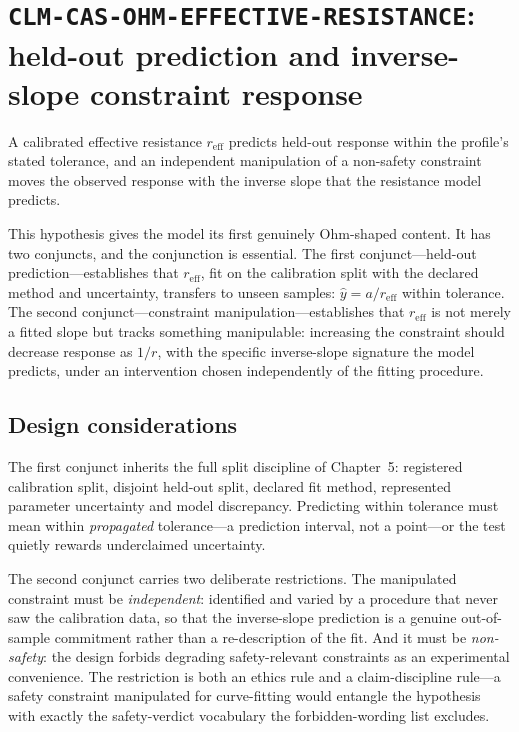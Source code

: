 \section{\texttt{CLM-CAS-OHM-EFFECTIVE-RESISTANCE}: held-out prediction and inverse-slope constraint response}\label{hyp:sec:resistance}

\begin{hypothesis}\label{hyp:hyp:resistance}
A calibrated effective resistance $r_{\mathrm{eff}}$ predicts held-out response within the profile's stated tolerance, and an independent manipulation of a non-safety constraint moves the observed response with the inverse slope that the resistance model predicts.
\end{hypothesis}

This hypothesis gives the model its first genuinely Ohm-shaped content. It has two conjuncts, and the conjunction is essential. The first conjunct---held-out prediction---establishes that $r_{\mathrm{eff}}$, fit on the calibration split with the declared method and uncertainty, transfers to unseen samples: $\hat y = a/r_{\mathrm{eff}}$ within tolerance. The second conjunct---constraint manipulation---establishes that $r_{\mathrm{eff}}$ is not merely a fitted slope but tracks something manipulable: increasing the constraint should decrease response as $1/r$, with the specific inverse-slope signature the model predicts, under an intervention chosen independently of the fitting procedure.

\subsection{Design considerations}

The first conjunct inherits the full split discipline of Chapter~5: registered calibration split, disjoint held-out split, declared fit method, represented parameter uncertainty and model discrepancy. Predicting within tolerance must mean within \emph{propagated} tolerance---a prediction interval, not a point---or the test quietly rewards underclaimed uncertainty.

The second conjunct carries two deliberate restrictions. The manipulated constraint must be \emph{independent}: identified and varied by a procedure that never saw the calibration data, so that the inverse-slope prediction is a genuine out-of-sample commitment rather than a re-description of the fit. And it must be \emph{non-safety}: the design forbids degrading safety-relevant constraints as an experimental convenience. The restriction is both an ethics rule and a claim-discipline rule---a safety constraint manipulated for curve-fitting would entangle the hypothesis with exactly the safety-verdict vocabulary the forbidden-wording list excludes.

